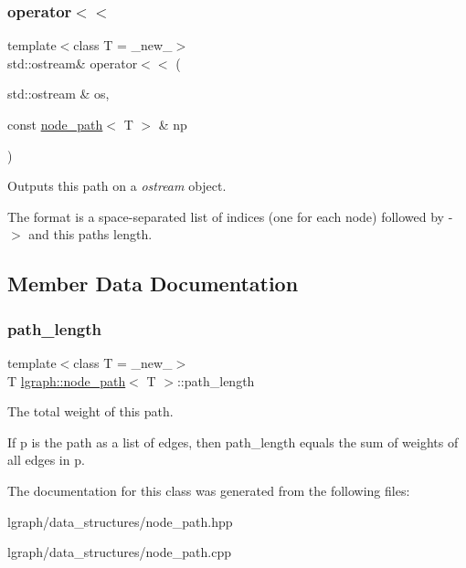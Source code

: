 \subsubsection{\texorpdfstring{operator$<$$<$}{operator<<}}
{\footnotesize\ttfamily template$<$class T = \+\_\+new\+\_\+$>$ \\
std\+::ostream\& operator$<$$<$ (\begin{DoxyParamCaption}\item[{std\+::ostream \&}]{os,  }\item[{const \hyperlink{classlgraph_1_1node__path}{node\+\_\+path}$<$ T $>$ \&}]{np }\end{DoxyParamCaption})\hspace{0.3cm}{\ttfamily [friend]}}



Outputs this path on a {\itshape ostream} object. 

The format is a space-\/separated list of indices (one for each node) followed by \textquotesingle{}-\/$>$\textquotesingle{} and this path\textquotesingle{}s length. 

\subsection{Member Data Documentation}
\mbox{\label{classlgraph_1_1node__path_a3461f9839615e5bc4837d24438117f16}} 
\subsubsection{\texorpdfstring{path\+\_\+length}{path\_length}}
{\footnotesize\ttfamily template$<$class T = \+\_\+new\+\_\+$>$ \\
T \hyperlink{classlgraph_1_1node__path}{lgraph\+::node\+\_\+path}$<$ T $>$\+::path\+\_\+length\hspace{0.3cm}{\ttfamily [private]}}



The total weight of this path. 

If \textquotesingle{}p\textquotesingle{} is the path as a list of edges, then \textquotesingle{}path\+\_\+length\textquotesingle{} equals the sum of weights of all edges in \textquotesingle{}p\textquotesingle{}. 

The documentation for this class was generated from the following files\+:\begin{DoxyCompactItemize}
\item 
lgraph/data\+\_\+structures/node\+\_\+path.\+hpp\item 
lgraph/data\+\_\+structures/node\+\_\+path.\+cpp\end{DoxyCompactItemize}
